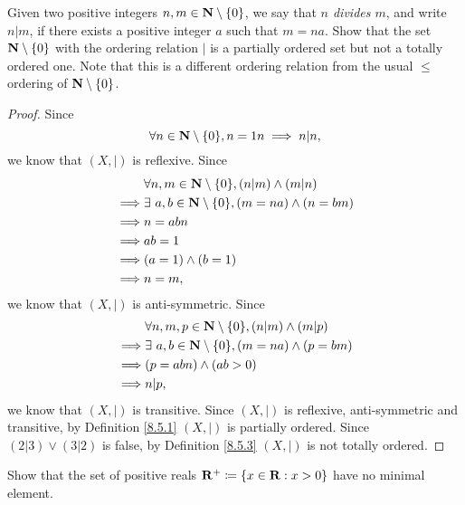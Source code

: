 \begin{exercise}\label{ex 8.5.3}
    Given two positive integers \(n, m \in \mathbf{N} \setminus \{0\}\), we say that \emph{\(n\) divides \(m\)}, and write \(n | m\), if there exists a positive integer \(a\) such that \(m = na\).
    Show that the set \(\mathbf{N} \setminus \{0\}\) with the ordering relation \(|\) is a partially ordered set but not a totally ordered one.
    Note that this is a different ordering relation from the usual \(\leq\) ordering of \(\mathbf{N} \setminus \{0\}\).
\end{exercise}

\begin{proof}
    Since
    \[
        \forall n \in \mathbf{N} \setminus \{0\}, n = 1n \implies n | n,
    \]
    we know that \((X, |)\) is reflexive.
    Since
    \begin{align*}
                 & \forall n, m \in \mathbf{N} \setminus \{0\}, (n | m) \land (m | n)    \\
        \implies & \exists\ a, b \in \mathbf{N} \setminus \{0\}, (m = na) \land (n = bm) \\
        \implies & n = abn                                                       \\
        \implies & ab = 1                                                        \\
        \implies & (a = 1) \land (b = 1)                                         \\
        \implies & n = m,
    \end{align*}
    we know that \((X, |)\) is anti-symmetric.
    Since
    \begin{align*}
                 & \forall n, m, p \in \mathbf{N} \setminus \{0\}, (n | m) \land (m | p) \\
        \implies & \exists\ a, b \in \mathbf{N} \setminus \{0\}, (m = na) \land (p = bm) \\
        \implies & (p = abn) \land (ab > 0)                                      \\
        \implies & n | p,
    \end{align*}
    we know that \((X, |)\) is transitive.
    Since \((X, |)\) is reflexive, anti-symmetric and transitive, by Definition \ref{8.5.1} \((X, |)\) is partially ordered.
    Since \((2 | 3) \lor (3 | 2)\) is false, by Definition \ref{8.5.3} \((X, |)\) is not totally ordered.
\end{proof}

\begin{exercise}\label{ex 8.5.4}
    Show that the set of positive reals \(\mathbf{R}^+ \coloneqq \{x \in \mathbf{R} : x > 0\}\) have no minimal element.
\end{exercise}

